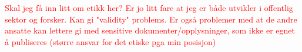 \textcolor{red}{Skal jeg få inn litt om etikk her? Er jo litt fare at jeg er både utvikler i offentlig sektor og forsker. Kan gi "validity" problems. Er også problemer med at de andre ansatte kan lettere gi med sensitive dokumenter/opplysninger, som ikke er egnet å publiseres (større ansvar for det etiske pga min posisjon)}

